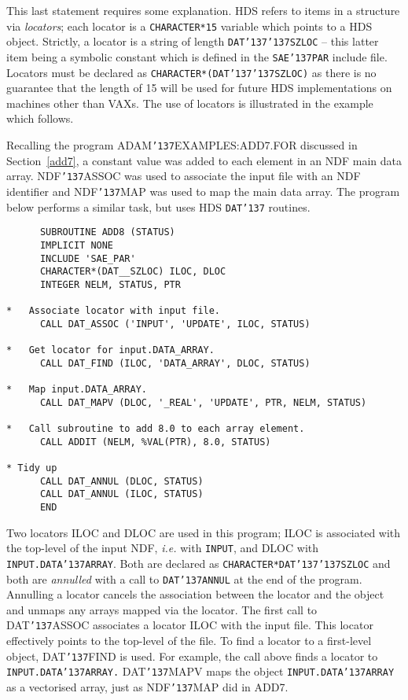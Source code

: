 \documentclass[twoside,11pt]{article}
\renewcommand{\_}{{\tt\char'137}}
\begin{document}
This last statement requires some explanation. 
HDS refers to items in a structure via {\sl locators}; each 
locator is a {\tt CHARACTER*15} variable which points to a HDS object.
Strictly, a locator is a string of length {\tt DAT\_\_SZLOC} -- this latter
item being a symbolic constant which is defined in the {\tt SAE\_PAR} 
include file.
Locators must be declared as {\tt CHARACTER*(DAT\_\_SZLOC)} as there is no 
guarantee that the length of 15 will be 
used for future HDS implementations on machines other 
than VAXs.
The use of locators is illustrated in the example which follows.

Recalling the program ADAM\_EXAMPLES:ADD7.FOR discussed in 
Section~\ref{add7}, a constant value was added to each element in 
an NDF main data array. NDF\_ASSOC was used to associate the input file
with an NDF identifier and NDF\_MAP was used to map the main data array.
The program below performs a similar task, but uses HDS {\tt DAT\_} routines.
\begin{verbatim}
      SUBROUTINE ADD8 (STATUS)
      IMPLICIT NONE
      INCLUDE 'SAE_PAR'
      CHARACTER*(DAT__SZLOC) ILOC, DLOC
      INTEGER NELM, STATUS, PTR

*   Associate locator with input file.
      CALL DAT_ASSOC ('INPUT', 'UPDATE', ILOC, STATUS)

*   Get locator for input.DATA_ARRAY.
      CALL DAT_FIND (ILOC, 'DATA_ARRAY', DLOC, STATUS)

*   Map input.DATA_ARRAY.
      CALL DAT_MAPV (DLOC, '_REAL', 'UPDATE', PTR, NELM, STATUS)

*   Call subroutine to add 8.0 to each array element.
      CALL ADDIT (NELM, %VAL(PTR), 8.0, STATUS)

* Tidy up
      CALL DAT_ANNUL (DLOC, STATUS)
      CALL DAT_ANNUL (ILOC, STATUS)
      END
\end{verbatim}
Two locators ILOC and DLOC are used in this program; ILOC  is associated
with the top-level of the input NDF, {\it i.e.} with {\tt INPUT}, and DLOC 
with {\tt INPUT.DATA\_ARRAY}.
Both are declared as
{\tt CHARACTER*DAT\_\_SZLOC} and both are {\sl annulled\/} with a call
to {\tt DAT\_ANNUL} at the end of the program. 
Annulling a locator cancels the association between the locator and the 
object and unmaps any arrays mapped via the locator.
The first call to DAT\_ASSOC associates a locator ILOC with the input file.
This locator effectively points to the top-level of the file.
To find a locator to a first-level object, DAT\_FIND is used.
For example, the call above finds a locator to {\tt INPUT.DATA\_ARRAY.}
DAT\_MAPV maps the object {\tt INPUT.DATA\_ARRAY} as a vectorised array,
just as NDF\_MAP did in ADD7.
\end{document}
